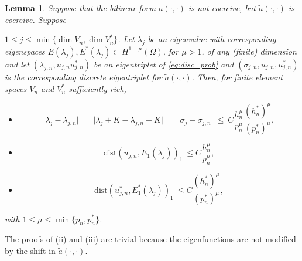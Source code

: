 \documentclass[preprint,12pt]{elsarticle}
\newtheorem{lemma}[theorem]{Lemma}
\begin{document}
\begin{lemma}
\label{lm:adj_2}
Suppose  that the bilinear form $a(\cdot,\cdot)$ is not coercive, but  $\tilde a(\cdot,\cdot)$ is coercive.
Suppose

$ 1 \leq j\leq \min\{\dim V_n,\dim V_n^*\}$. Let
$\lambda_j$ be an eigenvalue with
corresponding eigenspaces $E(\lambda_j),E^*(\lambda_j)\subset H^{1+\mu}(\Omega)$, for $\mu>1$, of any (finite) dimension  and
let $(\lambda_{j,n},u_{j,n}u_{j,n}^*)$ be an  eigentriplet  of \eqref{eq:disc_prob} and $(\sigma_{j,n},u_{j,n},u_{j,n}^*)$ is the corresponding discrete eigentriplet for $\tilde a(\cdot,\cdot)$.
Then, for finite element spaces $V_n$ and $V_n^*$ sufficiently rich,
\begin{itemize}
\item[(i)] 
\begin{equation}\label{eq:supereig_2}
\vert \lambda_j - \lambda_{j,n} \vert\ = \ \vert \lambda_j+K - \lambda_{j,n}-K \vert 
\ = \ \vert \sigma_j - \sigma_{j,n} \vert\ \leq \ C
\frac{h_n^{\mu} }{p_n^{\mu}}\frac{(h_n^*)^{\mu} }{(p_n^*)^{\mu}},
\end{equation}
\item[(ii)] 
\begin{equation}
\label{eq:energy_2} \mathrm{dist}(
u_{j,n},E_1(\lambda_j))_{1} \ \leq
C \frac{h_n^{\mu}}{p_n^{\mu}}, 
\end{equation}
\item[(iii)]
\begin{equation}
\label{eq:energy_dual_2} \mathrm{dist}(
u_{j,n}^*,E_1^*(\lambda_j))_{1} \ \leq
C \frac{(h_n^*)^{\mu}}{(p_n^*)^{\mu}}, 
\end{equation}
\end{itemize}
with $1\leq \mu\leq \min\{p_n,p_n^*\}$.
\end{lemma}

The proofs of (ii) and (iii) are trivial because the eigenfunctions are not modified by the shift in  $\tilde a(\cdot,\cdot)$.

\end{document}

